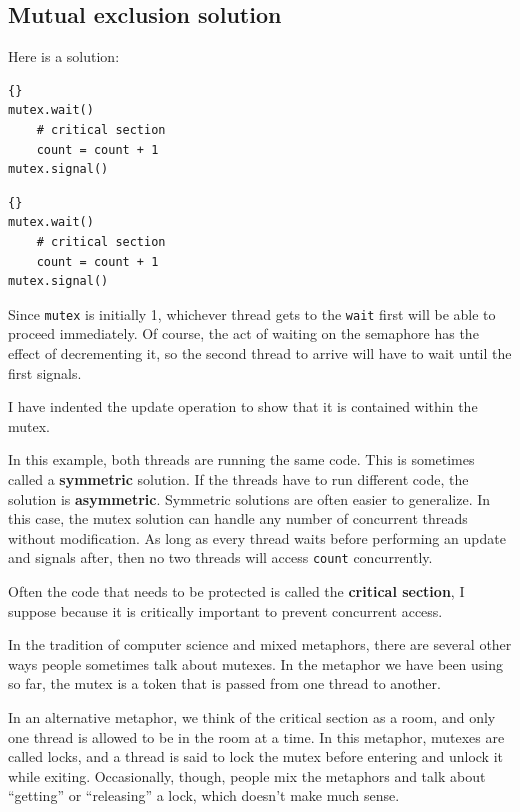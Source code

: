 \documentclass{book}
\newcommand{\clearemptydoublepage}{\newpage\cleardoublepage}
\begin{document}
\clearemptydoublepage
\subsection{Mutual exclusion solution}

Here is a solution:

\begin{minipage}[t]{2in}
\begin{lstlisting}[title={Thread A}]{}
mutex.wait()
    # critical section
    count = count + 1
mutex.signal()
\end{lstlisting}
\end{minipage}
\hfill
\begin{minipage}[t]{2in}
\begin{lstlisting}[title={Thread B}]{}
mutex.wait()
    # critical section
    count = count + 1
mutex.signal()
\end{lstlisting}
\end{minipage}

Since {\tt mutex} is initially 1, whichever thread gets to
the {\tt wait} first will be able to proceed immediately.
Of course, the act of waiting on the semaphore has the effect
of decrementing it, so the second thread to
arrive will have to wait until the first signals.

I have indented the update operation to show that it is contained
within the mutex.

In this example, both threads are running the same code.  This is
sometimes called a {\bf symmetric} solution.  If the threads have to
run different code, the solution is {\bf asymmetric}.  Symmetric
solutions are often easier to generalize.  In this case, the mutex
solution can handle any number of concurrent threads without
modification.  As long as every thread waits before 
performing an update and signals after, then no two threads
will access {\tt count} concurrently.

Often the code that needs to be protected is called the
{\bf critical section}, I suppose because it is critically
important to prevent concurrent access.

In the tradition of computer science and mixed metaphors, there
are several other ways people sometimes talk about mutexes.  In
the metaphor we have been using so far, the mutex is a token
that is passed from one thread to another.

In an alternative
metaphor, we think of the critical section as a room, and
only one thread is allowed to be in the room at a time.
In this metaphor, mutexes are called locks, and a thread
is said to lock the mutex before entering and unlock it while
exiting.  Occasionally, though, people mix the metaphors and
talk about ``getting'' or ``releasing'' a lock, which doesn't
make much sense.
\end{document}
